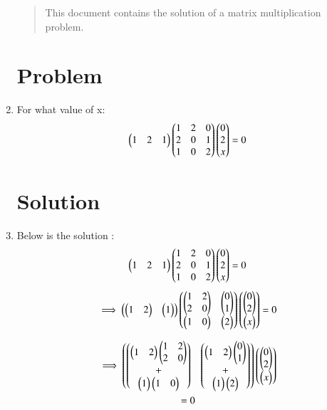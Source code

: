 \begin{enumerate}[label=\thesection.\arabic*.,ref=\thesection.\theenumi]

\begin{abstract}
    This document contains the solution of a matrix multiplication problem.
\end{abstract}

\section{Problem}
\item For what value of x:
\begin{align}
    \myvec{1 & 2 & 1}\myvec{1 & 2 & 0 \\2 & 0 & 1\\1 & 0 & 2}\myvec{0 \\ 2 \\ x}=0
\end{align}

\section{Solution}
\item Below is the solution :
\begin{align}
    \myvec{1 & 2 & 1}\myvec{1 & 2 & 0 \\2 & 0 & 1\\1 & 0 & 2}\myvec{0 \\ 2 \\ x}=0
\end{align}
\begin{multline}
    \implies \myvec{\myvec{1&2}&\myvec{1}}\myvec{\myvec{1&2\\2&0}&\myvec{0\\1}\\\myvec{1&0}&\myvec{2}}\myvec{\myvec{0\\2}\\\myvec{x}}=0
\end{multline}
    


\begin{multline}
\implies \myvec{\myvec{\myvec{1&2}\myvec{1&2\\2&0}\\+\\\myvec{1}\myvec{1&0}}&\myvec{\myvec{1&2}\myvec{0\\1}\\+\\\myvec{1}\myvec{2}}}\myvec{\myvec{0\\2}\\\myvec{x}}\\=0
\end{multline}


\end{enumerate}
